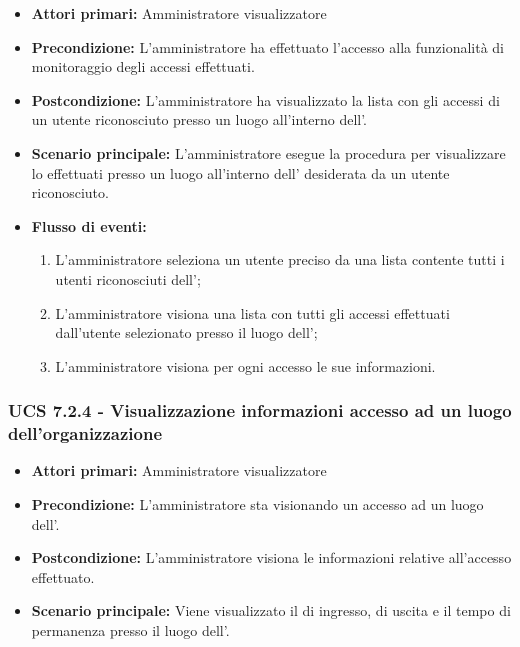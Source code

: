 \begin{itemize}
	\item \textbf{Attori primari:} Amministratore visualizzatore
	\item \textbf{Precondizione:} L'amministratore ha effettuato l'accesso alla funzionalità di monitoraggio degli accessi effettuati.
	\item \textbf{Postcondizione:} L'amministratore ha visualizzato la lista con gli accessi di un utente riconosciuto presso un luogo all'interno dell'.
	\item \textbf{Scenario principale:} L'amministratore esegue la procedura per visualizzare lo  effettuati presso un luogo all'interno dell' desiderata da un utente riconosciuto.
	\item \textbf{Flusso di eventi:}
	\begin{enumerate}
		\item L'amministratore seleziona un utente preciso da una lista contente tutti i utenti riconosciuti dell';
		\item L'amministratore visiona una lista con tutti gli accessi effettuati dall'utente selezionato presso il luogo dell';
		\item L'amministratore visiona per ogni accesso le sue informazioni.
	\end{enumerate}
\end{itemize}

\subsubsection{UCS 7.2.4 - Visualizzazione informazioni accesso ad un luogo dell'organizzazione}
\begin{itemize}
	\item \textbf{Attori primari:} Amministratore visualizzatore
	\item \textbf{Precondizione:} L'amministratore sta visionando un accesso ad un luogo dell'.
	\item \textbf{Postcondizione:} L'amministratore visiona le informazioni relative all'accesso effettuato.
	\item \textbf{Scenario principale:} Viene visualizzato il  di ingresso, di uscita e il tempo di permanenza presso il luogo dell'.
\end{itemize}

